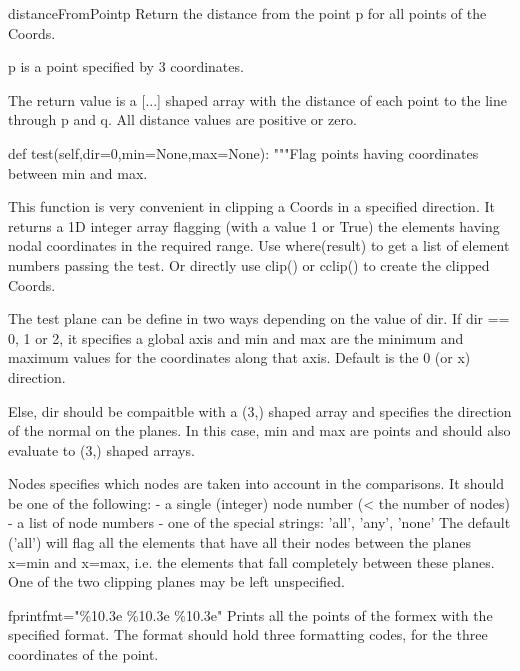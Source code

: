 \begin{methoddesc}{distanceFromPoint}{p}
    Return the distance from the point p for all points of the Coords.

    p is a point specified by 3 coordinates.

    The return value is a [...] shaped array with the distance of
    each point to the line through p and q.
    All distance values are positive or zero.
\end{methoddesc}


    def test(self,dir=0,min=None,max=None):
        """Flag points having coordinates between min and max.

        This function is very convenient in clipping a Coords in a specified
        direction. It returns a 1D integer array flagging (with a value 1 or
        True) the elements having nodal coordinates in the required range.
        Use where(result) to get a list of element numbers passing the test.
        Or directly use clip() or cclip() to create the clipped Coords.
        
        The test plane can be define in two ways depending on the value of dir.
        If dir == 0, 1 or 2, it specifies a global axis and min and max are
        the minimum and maximum values for the coordinates along that axis.
        Default is the 0 (or x) direction.

        Else, dir should be compaitble with a (3,) shaped array and specifies
        the direction of the normal on the planes. In this case, min and max
        are points and should also evaluate to (3,) shaped arrays.
        
        Nodes specifies which nodes are taken into account in the comparisons.
        It should be one of the following:
        - a single (integer) node number (< the number of nodes)
        - a list of node numbers
        - one of the special strings: 'all', 'any', 'none'
        The default ('all') will flag all the elements that have all their
        nodes between the planes x=min and x=max, i.e. the elements that
        fall completely between these planes. One of the two clipping planes
        may be left unspecified.


\begin{methoddesc}{fprint}{fmt="\%10.3e \%10.3e \%10.3e"}
Prints all the points of the formex with the specified format. The format should hold three formatting codes, for the three coordinates of the point. 
\end{methoddesc}


